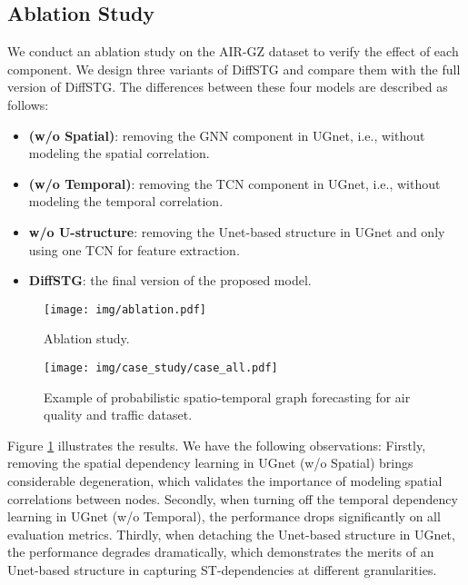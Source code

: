 {\subsection{Ablation Study}

We conduct an ablation study on the AIR-GZ dataset to verify the effect of each component. We design three variants of DiffSTG and compare them with the full version of DiffSTG. The differences between these four models are described as follows:

\begin{itemize}
    \item  \textbf{(w/o Spatial)}: removing the GNN component in UGnet, i.e., without modeling the spatial correlation.
    \item \textbf{(w/o Temporal)}: removing the TCN component in UGnet, i.e., without modeling the temporal correlation.
    \item \textbf{w/o U-structure}: removing the Unet-based structure in UGnet and only using one TCN for feature extraction.
    \item \textbf{DiffSTG}: the final version of the proposed model.
\end{itemize}

\begin{figure}[!b]
    \centering
    \texttt{[image: img/ablation.pdf]} 
    \caption{Ablation study.}
    \label{fig:ablation}
\end{figure}

 \begin{figure*}[!t]
    \centering
    \texttt{[image: img/case\_study/case\_all.pdf]} 
    \caption{Example of probabilistic spatio-temporal graph forecasting for air quality and traffic dataset.}
    \label{fig:case_studys}
\end{figure*}

\par Figure \ref{fig:ablation} illustrates the results. We have the following observations: Firstly, removing the spatial dependency learning in UGnet (w/o Spatial) brings considerable degeneration, which validates the importance of modeling spatial correlations between nodes. Secondly, when turning off the temporal dependency learning in UGnet (w/o Temporal), the performance drops significantly on all evaluation metrics. Thirdly, when detaching the Unet-based structure in UGnet, the performance degrades dramatically, which demonstrates the merits of an Unet-based structure in capturing ST-dependencies at different granularities.

}

